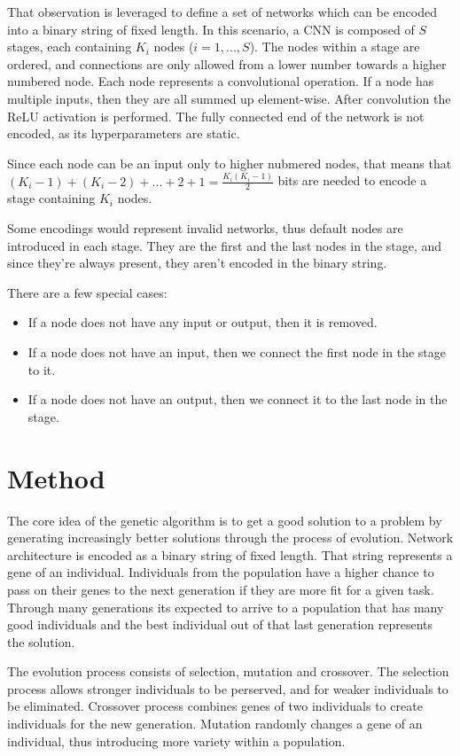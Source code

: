 \documentclass[eng]{simposium}
\begin{document}
That observation is leveraged to define a set of networks which 
can be encoded into a binary string of fixed length.
In this scenario, a CNN is composed of $S$ stages, each containing 
$K_i$ nodes ($i=1,...,S$). 
The nodes within a stage are ordered, and connections are only allowed from a lower number towards a higher numbered node.
Each node represents a convolutional operation. If a node has multiple inputs, then they are all summed up element-wise.
After convolution the ReLU activation is performed. 
The fully connected end of the network is not encoded, as its hyperparameters are static.

Since each node can be an input only to higher nubmered nodes, that means that 
$(K_i -1) + (K_i - 2) + ... + 2 + 1 = \frac{K_i(K_i-1)}{2} $ bits are needed to encode a stage containing $K_i$ nodes.

Some encodings would represent invalid networks, thus default nodes are introduced in each stage.
They are the first and the last nodes in the stage, and since they're always present, they aren't encoded in the binary string.

There are a few special cases:
\begin{itemize}
    \item If a node does not have any input or output, then it is removed.
    \item If a node does not have an input, then we connect the first node in the stage to it.
    \item If a node does not have an output, then we connect it to the last node in the stage.
\end{itemize}

\section{Method}

The core idea of the genetic algorithm is to get a good solution to a problem by generating increasingly better solutions through the process of evolution.
Network architecture is encoded as a binary string of fixed length. That string represents a gene of an individual.
Individuals from the population have a higher chance to pass on their genes to the next generation if they are more fit for a given task.
Through many generations its expected to arrive to a population that has many good individuals and the best individual out of that last generation represents the solution.

The evolution process consists of selection, mutation and crossover. 
The selection process allows stronger individuals to be perserved, and for weaker individuals to be eliminated.
Crossover process combines genes of two individuals to create individuals for the new generation.
Mutation randomly changes a gene of an individual, thus introducing more variety within a population.
\end{document}
